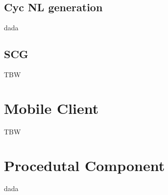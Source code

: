 \subsection{Cyc NL generation}
\label{section:cycnl}
dada

\subsection{SCG}
\label{section:scg}
TBW

\section{Mobile Client}
\label{section:app}
TBW

\section{Procedutal Component}
\label{section:prophet}
dada
